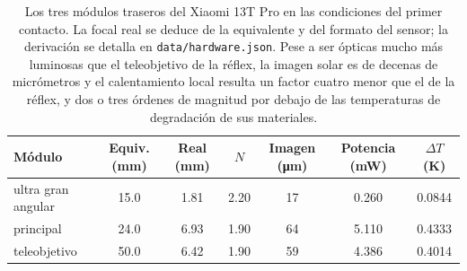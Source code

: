 \begin{table}[htbp]\centering\small
\caption{Los tres módulos traseros del Xiaomi 13T Pro en las condiciones del primer contacto. La focal real se deduce de la equivalente y del formato del sensor; la derivación se detalla en \texttt{data/hardware.json}. Pese a ser ópticas mucho más luminosas que el teleobjetivo de la réflex, la imagen solar es de decenas de micrómetros y el calentamiento local resulta un factor cuatro menor que el de la réflex, y dos o tres órdenes de magnitud por debajo de las temperaturas de degradación de sus materiales.}
\label{tab:phone}
\begin{tabular}{lS[table-format=2.1]S[table-format=1.2]S[table-format=1.2]S[table-format=3.0]S[table-format=1.3]S[table-format=1.4]}
\toprule
Módulo & {Equiv. (mm)} & {Real (mm)} & {$N$} & {Imagen (\si{\micro\meter})} & {Potencia (mW)} & {$\Delta T$ (K)} \\
\midrule
ultra gran angular & 15.0 & 1.81 & 2.20 & 17 & 0.260 & 0.0844 \\
principal & 24.0 & 6.93 & 1.90 & 64 & 5.110 & 0.4333 \\
teleobjetivo & 50.0 & 6.42 & 1.90 & 59 & 4.386 & 0.4014 \\
\bottomrule
\end{tabular}
\end{table}
